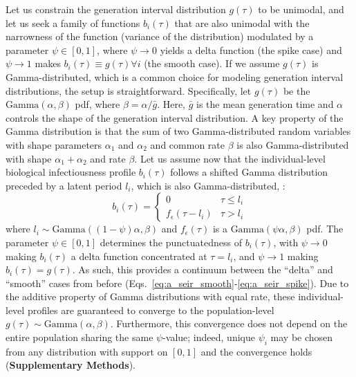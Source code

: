 Let us constrain the generation interval distribution $g(\tau)$ to be unimodal, and let us seek a family of functions $b_i(\tau)$ that are also unimodal with the narrowness of the function (variance of the distribution) modulated by a parameter $\psi \in [0,1]$, where $\psi \rightarrow 0$ yields a delta function (the spike case) and $\psi \rightarrow 1$ makes $b_i(\tau) \equiv g(\tau) \forall i$ (the smooth case). If we assume $g(\tau)$ is Gamma-distributed, which is a common choice for modeling generation interval distributions, the setup is straightforward. Specifically, let $g(\tau)$ be the $\text{Gamma}(\alpha, \beta)$ pdf, where $\beta = \alpha / \bar{g}$. Here, $\bar{g}$ is the mean generation time and $\alpha$ controls the shape of the generation interval distribution. A key property of the Gamma distribution is that the sum of two Gamma-distributed random variables with shape parameters $\alpha_1$ and $\alpha_2$ and common rate $\beta$ is also Gamma-distributed with shape $\alpha_1 + \alpha_2$ and rate $\beta$. Let us assume now that the individual-level biological infectiousness profile $b_i(\tau)$ follows a shifted Gamma distribution preceded by a latent period $l_i$, which is also Gamma-distributed, \ie: 
%
\begin{equation}
    b_i(\tau) = \begin{cases}
      0 & \tau \leq l_i  \\ 
      f_\epsilon(\tau - l_i) & \tau > l_i 
    \end{cases}
    \label{eq:gamma_timeshift}
\end{equation}
% 
where $l_i \sim \text{Gamma}((1-\psi)\alpha, \beta)$ and $f_\epsilon(\tau)$ is a $\text{Gamma}(\psi \alpha, \beta)$ pdf. The parameter $\psi \in [0,1]$ determines the punctuatedness of $b_i(\tau)$, with $\psi \rightarrow 0$ making $b_i(\tau)$ a delta function concentrated at $\tau = l_i$, and $\psi \rightarrow 1$ making $b_i(\tau) = g(\tau)$. As such, this provides a continuum between the ``delta'' and ``smooth'' cases from before (Eqs.~\ref{eq:a_seir_smooth}-\ref{eq:a_seir_spike}). Due to the additive property of Gamma distributions with equal rate, these individual-level profiles are guaranteed to converge to the population-level $g(\tau) \sim \text{Gamma}(\alpha,\beta)$. Furthermore, this convergence does not depend on the entire population sharing the same $\psi$-value; indeed, unique $\psi_i$ may be chosen from any distribution with support on $[0,1]$ and the convergence holds ({\bf Supplementary Methods}). 


